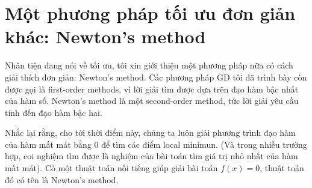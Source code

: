  
 
 
\section{Một phương pháp tối ưu đơn giản khác: Newton's method}
 
Nhân tiện đang nói về tối ưu, tôi xin giới thiệu một phương pháp nữa có cách giải thích đơn giản: Newton's method. Các phương pháp GD tôi đã trình bày còn được gọi là first-order methods, vì lời giải tìm được dựa trên đạo hàm bậc nhất của hàm số. Newton's method là một second-order method, tức lời giải yêu cầu tính đến đạo hàm bậc hai. 
 
 
Nhắc lại rằng, cho tới thời điểm này, chúng ta luôn giải phương trình đạo hàm của hàm mất mát bằng 0 để tìm các điểm local minimun. (Và trong nhiều trường hợp, coi nghiệm tìm được là nghiệm của bài toán tìm giá trị nhỏ nhất của hàm mất mát). Có một thuật toán nối tiếng giúp giải bài toán $f(x) = 0$, thuật toán đó có tên là Newton's method. 
 
 
 
 
 
 
 
 
 
 
